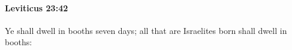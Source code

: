 
		\paragraph{Leviticus 23:42} %
			\label{LEVITICUS-23-42}

			Ye shall dwell in booths seven days; all that are Israelites born shall dwell in booths:


